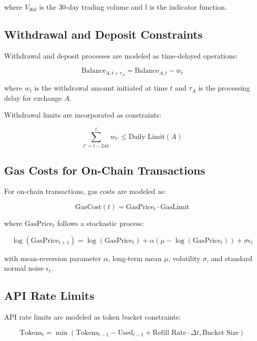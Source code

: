 \documentclass{article}
\begin{document}
where $V_{30d}$ is the 30-day trading volume and $\mathbb{I}$ is the indicator function.

\subsection{Withdrawal and Deposit Constraints}

Withdrawal and deposit processes are modeled as time-delayed operations:

\begin{equation}
\text{Balance}_{A, t+\tau_A} = \text{Balance}_{A, t} - w_t
\end{equation}

where $w_t$ is the withdrawal amount initiated at time $t$ and $\tau_A$ is the processing delay for exchange $A$.

Withdrawal limits are incorporated as constraints:

\begin{equation}
\sum_{t'=t-24h}^{t} w_{t'} \leq \text{Daily Limit}(A)
\end{equation}

\subsection{Gas Costs for On-Chain Transactions}

For on-chain transactions, gas costs are modeled as:

\begin{equation}
\text{GasCost}(t) = \text{GasPrice}_t \cdot \text{GasLimit}
\end{equation}

where $\text{GasPrice}_t$ follows a stochastic process:

\begin{equation}
\log(\text{GasPrice}_{t+1}) = \log(\text{GasPrice}_t) + \alpha(\mu - \log(\text{GasPrice}_t)) + \sigma \epsilon_t
\end{equation}

with mean-reversion parameter $\alpha$, long-term mean $\mu$, volatility $\sigma$, and standard normal noise $\epsilon_t$.

\subsection{API Rate Limits}

API rate limits are modeled as token bucket constraints:

\begin{equation}
\text{Tokens}_t = \min(\text{Tokens}_{t-1} - \text{Used}_{t-1} + \text{Refill Rate} \cdot \Delta t, \text{Bucket Size})
\end{equation}
\end{document}
